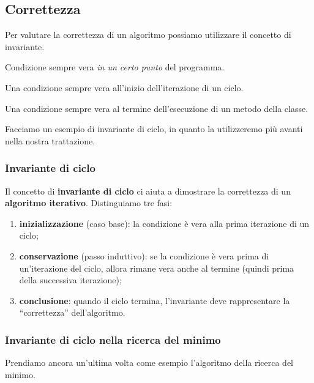 \subsection{Correttezza}

Per valutare la correttezza di un algoritmo possiamo utilizzare il concetto di invariante.

\begin{definition*}[invariante]
Condizione sempre vera \emph{in un certo punto} del programma.
\end{definition*}

\begin{definition*}
Una condizione sempre vera all'inizio dell'iterazione di un ciclo.
\end{definition*}

\begin{definition*}
Una condizione sempre vera al termine dell'esecuzione di un metodo della classe.
\end{definition*}

Facciamo un esempio di invariante di ciclo, in quanto la utilizzeremo più avanti nella nostra trattazione.

\subsubsection{Invariante di ciclo}

Il concetto di \textbf{invariante di ciclo} ci aiuta a dimostrare la correttezza di un \textbf{algoritmo iterativo}.
Distinguiamo tre fasi:
\begin{enumerate}
	\item \textbf{inizializzazione} (caso base): la condizione è vera alla prima iterazione di un ciclo;
	\item \textbf{conservazione} (passo induttivo): se la condizione è vera prima di un'iterazione del ciclo, allora rimane vera anche al termine (quindi prima della successiva iterazione);
	\item \textbf{conclusione}: quando il ciclo termina, l'invariante deve rappresentare la \enquote{correttezza} dell'algoritmo.
\end{enumerate}

\subsubsection{Invariante di ciclo nella ricerca del minimo}

Prendiamo ancora un'ultima volta come esempio l'algoritmo della ricerca del minimo.

